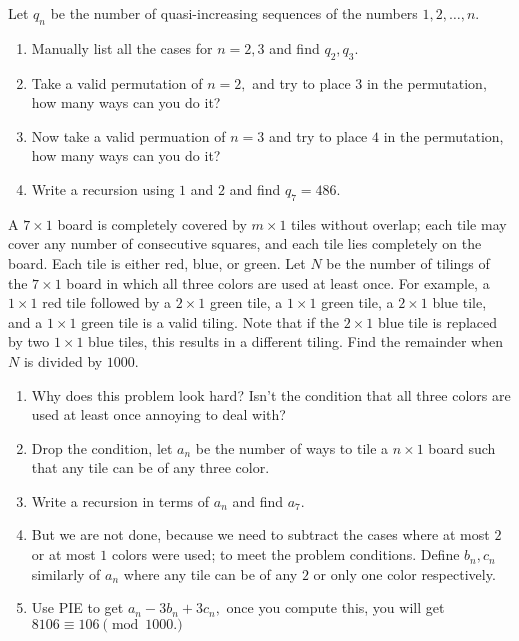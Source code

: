 \documentclass[11pt]{article}
\begin{document}
\begin{walk}
Let $q_n$ be the number of quasi-increasing sequences of the numbers $1, 2, \ldots, n.$

\begin{enumerate}
\item Manually list all the cases for $n=2, 3$ and find $q_2, q_3$.
\item Take a valid permutation of $n = 2,$ and try to place $3$ in the permutation, how many ways can you do it?
\item Now take  a valid permuation of $n= 3$ and try to place $4$ in the permutation, how many ways can you do it?
\item  Write a recursion using $1$ and $2$ and find $q_7=486.$
\end{enumerate}
\end{walk}


\begin{exam}[AIME 2013 II/9]
A $7 \times 1$ board is completely covered by $m \times 1$ tiles without overlap; each tile may cover any number of consecutive squares, and each tile lies completely on the board. Each tile is either red, blue, or green. Let $N$ be the number of tilings of the $7 \times 1$ board in which all three colors are used at least once. For example, a $1 \times 1$ red tile followed by a $2 \times 1$ green tile, a $1 \times 1$ green tile, a $2 \times 1$ blue tile, and a $1 \times 1$ green tile is a valid tiling. Note that if the $2 \times 1$ blue tile is replaced by two $1 \times 1$ blue tiles, this results in a different tiling. Find the remainder when $N$ is divided by $1000$.
\end{exam}


\begin{walk}
\begin{enumerate}
\item Why does this problem look hard? Isn't the condition that all three colors are used at least once annoying to deal with?
\item Drop the condition, let $a_n$ be the number of ways to tile a $n \times 1$ board such that any tile can be of any three color.
\item Write a recursion in terms of $a_n$ and find $a_7.$
\item But we are not done, because we need to subtract the cases where at most $2$ or at most $1$ colors were used; to meet the problem conditions.
Define $b_n, c_n$ similarly of $a_n$ where any tile can be of any $2$ or only one color respectively. 
\item Use PIE to get $a_n - 3b_n + 3c_n,$ once you compute this, you will get $8106 \equiv 106 \pmod{1000.}$
\end{enumerate}
\end{walk}
\end{document}
